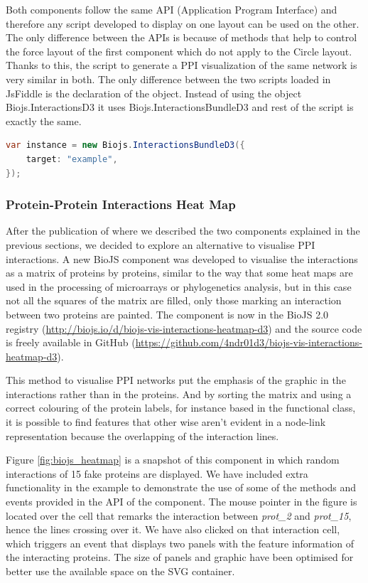 Both components follow the same API (Application Program Interface) and therefore any script developed to display on one layout can be used on the other. The only difference between the APIs is because of methods that help to control the force layout of the first component which do not apply to the Circle layout. Thanks to this, the script to generate a PPI visualization of the same network is very similar in both.  The only difference between the two scripts loaded in JsFiddle is the declaration of the object. Instead of using the object Biojs.InteractionsD3 it uses Biojs.InteractionsBundleD3 and rest of the script is exactly the same.
\begin{lstlisting}[language=java]
var instance = new Biojs.InteractionsBundleD3({
    target: "example",
});
\end{lstlisting}





\subsubsection{Protein-Protein Interactions Heat Map} \label{subsubsec:ppi3_biojs}
After the publication of \cite{SAL2014} where we described the two components explained in the previous sections, we decided to explore an alternative to visualise PPI interactions. A new BioJS component was developed to visualise the interactions as a matrix of proteins by proteins, similar to the way that some heat maps are used in the processing of microarrays or phylogenetics analysis, but in this case not all the squares of the matrix are filled, only those marking an interaction between two proteins are painted. The component is now in the BioJS 2.0 registry (\url{http://biojs.io/d/biojs-vis-interactions-heatmap-d3}) and the source code is freely available in GitHub (\url{https://github.com/4ndr01d3/biojs-vis-interactions-heatmap-d3}).

This method to visualise PPI networks put the emphasis of the graphic in the interactions rather than in the proteins. And by sorting the matrix and using a correct colouring of the protein labels, for instance based in the functional class, it is possible to find features that other wise aren't evident in a node-link representation because the overlapping of the interaction lines.

Figure \ref{fig:biojs_heatmap} is a snapshot of this component  in which random interactions of 15 fake proteins are displayed. We have included extra functionality in the example to demonstrate the use of some of the methods and events provided in the API of the component. The mouse pointer in the figure is located over the cell that remarks the interaction between \emph{prot\_2} and \emph{prot\_15}, hence the lines crossing over it. We have also clicked on that interaction cell, which triggers an event that displays two panels with the feature information of the interacting proteins. The size of panels and graphic have been optimised for better use the available space on the SVG container.


